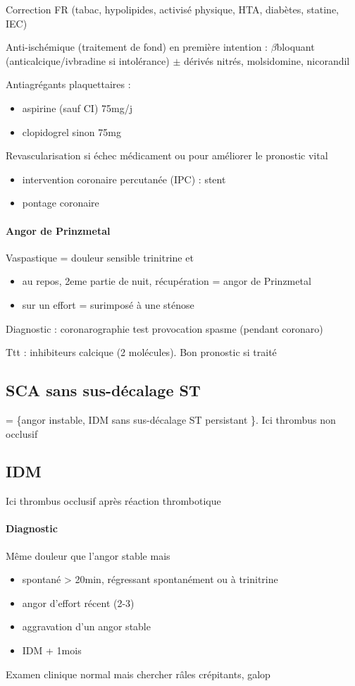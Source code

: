 Correction FR (tabac, hypolipides, activisé physique, HTA, diabètes, statine,
IEC)

Anti-ischémique (traitement de fond) en première intention : $\beta$bloquant
(anticalcique/ivbradine si intolérance) $\pm$ {dérivés nitrés, molsidomine,
nicorandil}

Antiagrégants plaquettaires :
\begin{itemize}
  \item aspirine (sauf CI) 75mg/j
  \item clopidogrel sinon 75mg
\end{itemize}
Revascularisation si échec médicament ou pour améliorer le pronostic vital
\begin{itemize}
  \item intervention coronaire percutanée (IPC) : stent
  \item pontage coronaire
\end{itemize}

\paragraph{Angor de Prinzmetal} Vaspastique = douleur sensible trinitrine et
\begin{itemize}
  \item au repos, 2eme partie de nuit, récupération = angor de Prinzmetal
  \item sur un effort = surimposé à une sténose
\end{itemize}
Diagnostic : coronarographie \thus test provocation spasme (pendant coronaro)

Ttt : inhibiteurs calcique (2 molécules).
Bon pronostic si traité

\subsection{SCA sans sus-décalage ST}

= \{angor instable, IDM sans sus-décalage ST persistant \}. Ici thrombus non
occlusif

\subsection{IDM}
Ici thrombus occlusif après réaction thrombotique

\paragraph{Diagnostic}
Même douleur que l'angor stable mais 
\begin{itemize}
  \item spontané > 20min, régressant spontanément ou à trinitrine
  \item angor d'effort récent (2-3)
  \item aggravation d'un angor stable
  \item IDM + 1mois
\end{itemize}
Examen clinique normal mais chercher râles crépitants, galop

